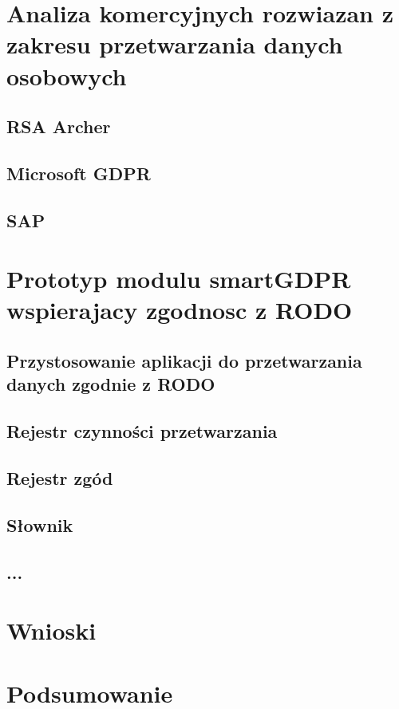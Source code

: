 \documentclass[en, noamssymb]{mgr}
\begin{document}
\chapter{Analiza komercyjnych rozwiazan z zakresu przetwarzania danych osobowych} \label{sec:sekcjaAnalizaRozwiazan}
\section{RSA Archer}
\section{Microsoft GDPR}
\section{SAP}

\chapter{Prototyp modulu smartGDPR wspierajacy zgodnosc z RODO} \label{sec:sekcjaOpisPrototypu}
\section{Przystosowanie aplikacji do przetwarzania danych zgodnie z RODO}
\section{Rejestr czynności przetwarzania}
\section{Rejestr zgód}
\section{Słownik}
\section{...}

\chapter{Wnioski} \label{sec:sekcjaWnioski}

\chapter{Podsumowanie}
\label{sec:Podsumowanie}

\end{document}
